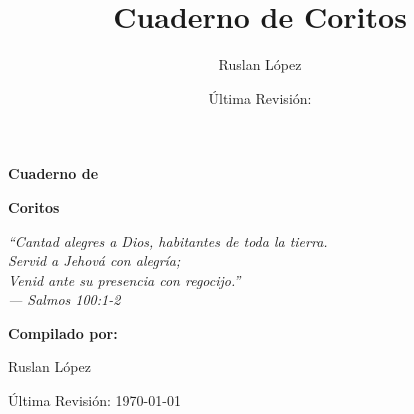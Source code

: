 \documentclass[12pt, spanish]{book}
\title{Cuaderno de Coritos}
\author{Ruslan L\'opez}
\date{\'Ultima Revisi\'on:  \RevDate}
\newcommand{\RevDate}{\today}
\begin{document}
    \hypersetup{pageanchor=false}

    \begin{titlepage}
        \centering

        \vspace*{1cm}

        {\Huge\bfseries\sffamily{$\dagger$}\par}

        \vspace{1.5cm}

        {\Huge\bfseries\sffamily Cuaderno de\par}
        \vspace{0.5cm}
        {\Huge\bfseries\sffamily Coritos\par}

        \vspace{2cm}

        \begin{center}
            \Large\itshape ``Cantad alegres a Dios, habitantes de toda la tierra.\\
            Servid a Jehov\'a con alegr\'ia;\\
            Venid ante su presencia con regocijo.''\\
            \vspace{0.3cm}
            --- Salmos 100:1-2
        \end{center}

        \vspace{2cm}

        {\Large\bfseries Compilado por:\par}
        \vspace{0.5cm}
        {\Large Ruslan L\'opez\par}

        \vfill

        {\large \'Ultima Revisi\'on: \RevDate\par}

        \vspace{1cm}

    \end{titlepage}

    \hypersetup{pageanchor=true}
    \ifWordBk
    \twocolumn
    \fi
\end{document}
